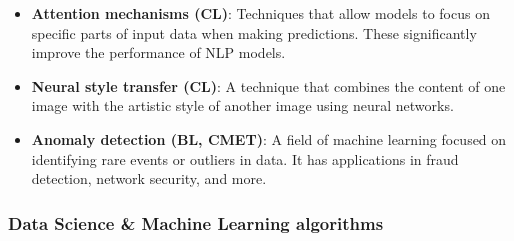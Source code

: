 \documentclass{article}
\begin{document}
\begin{itemize}
	\item \textbf{Attention mechanisms (CL)}: Techniques that allow models to focus on specific parts of input data when making predictions. These significantly improve the performance of NLP models.

	\item \textbf{Neural style transfer (CL)}: A technique that combines the content of one image with the artistic style of another image using neural networks.

	\item \textbf{Anomaly detection (BL, CMET)}: A field of machine learning focused on identifying rare events or outliers in data. It has applications in fraud detection, network security, and more.

\end{itemize}



\subsubsection*{Data Science \& Machine Learning algorithms}
\end{document}
